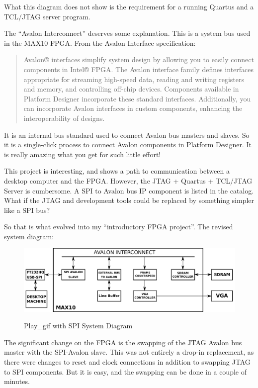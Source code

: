 What this diagram does not show is the requirement for a running Quartus and a TCL/JTAG server program.

The ``Avalon Interconnect'' deserves some explanation.  This is a system bus used in the MAX10 FPGA.  From the Avalon Interface specification:

\begin{quotation}
	Avalon® interfaces simplify system design by allowing you to easily connect
components in Intel® FPGA. The Avalon interface family defines interfaces appropriate
for streaming high-speed data, reading and writing registers and memory, and
controlling off-chip devices. Components available in Platform Designer incorporate
these standard interfaces. Additionally, you can incorporate Avalon interfaces in
custom components, enhancing the interoperability of designs.
\end{quotation}

It is an internal bus standard used to connect Avalon bus masters and slaves.  So it is a single-click process to connect Avalon components in Platform Designer.  It is really amazing what you get for such little effort!

This project is interesting, and shows a path to communication between a desktop computer and the FPGA.
However, the JTAG + Quartus + TCL/JTAG Server is cumbersome.  A SPI to Avalon bus IP component is listed in the catalog.
What if the JTAG and development tools could be replaced by something simpler like a SPI bus?

So that is what evolved into my ``introductory FPGA project''.  The revised system diagram:

\begin{figure}[h]
	\centering
	\includegraphics[width=1.0\textwidth]{images/spi_avalon_system}
	\centering\bfseries
	\caption{Play\_gif with SPI System Diagram}
\end{figure}

The significant change on the FPGA is the swapping of the JTAG Avalon bus master with the SPI-Avalon slave.  This was not entirely a drop-in replacement, as there were changes to reset and clock connections in addition to swapping JTAG to SPI components.  But it is easy, and the swapping can be done in a couple of minutes.

